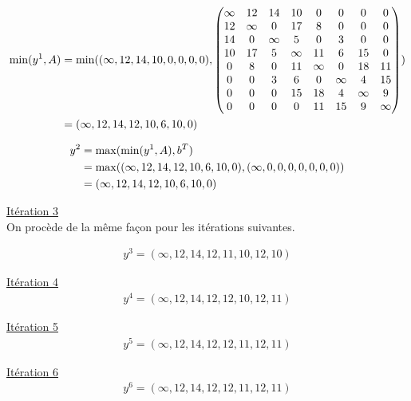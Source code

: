 \documentclass{article}
\begin{document}
\begin{align*}
  \operatorname{min}(y^1,A) &= \operatorname{min}((\infty,12,14,10,0,0,0,0),
  \begin{pmatrix}
      \infty & 12 & 14 & 10 & 0 & 0 & 0 & 0 \\
      12 & \infty & 0 & 17 & 8 & 0 & 0 & 0 \\
      14 & 0 & \infty & 5 & 0 & 3 & 0 & 0 \\
      10 & 17 & 5 & \infty & 11 & 6 & 15 & 0 \\
      0 & 8 & 0 & 11 & \infty & 0 & 18 & 11 \\
      0 & 0 & 3 & 6 & 0 & \infty & 4 & 15 \\
      0 & 0 & 0 & 15 & 18 & 4 & \infty & 9 \\
      0 & 0 & 0 & 0 & 11 & 15 & 9 & \infty
  \end{pmatrix})\\
  &= (\infty, 12,14,12,10,6,10,0)
\end{align*}

\begin{align*}
  y^2 &= \operatorname{max}(\operatorname{min}(y^1,A),b^T)\\
  &= \operatorname{max}((\infty, 12,14,12,10,6,10,0), (\infty,0,0,0,0,0,0,0))\\
  &= (\infty, 12,14,12,10,6,10,0)
\end{align*}

\underline{Itération 3}\\

On procède de la même façon pour les itérations suivantes.

\begin{align*}
  y^3 = (\infty,12,14,12,11,10,12,10)
\end{align*}

\underline{Itération 4}\\

\begin{align*}
  y^4 = (\infty,12,14,12,12,10,12,11)
\end{align*}

\underline{Itération 5}\\

\begin{align*}
  y^5 = (\infty,12,14,12,12,11,12,11)
\end{align*}

\underline{Itération 6}\\

\begin{align*}
  y^6 = (\infty,12,14,12,12,11,12,11)
\end{align*}\\
\end{document}
